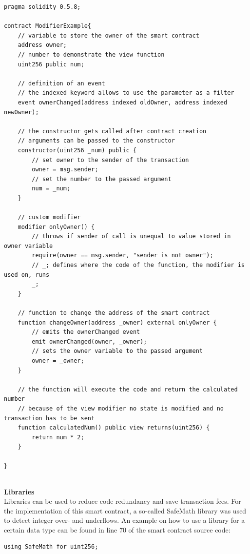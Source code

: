 \begin{lstlisting}[language=Solidity, caption={Basic structure of a smart contract}, label={lis:sc_basic_ref}]
pragma solidity 0.5.8;

contract ModifierExample{
    // variable to store the owner of the smart contract
    address owner;
    // number to demonstrate the view function
    uint256 public num;
    
    // definition of an event
    // the indexed keyword allows to use the parameter as a filter
    event ownerChanged(address indexed oldOwner, address indexed newOwner);
    
    // the constructor gets called after contract creation
    // arguments can be passed to the constructor
    constructor(uint256 _num) public {
        // set owner to the sender of the transaction
        owner = msg.sender;
        // set the number to the passed argument
        num = _num;
    }
    
    // custom modifier
    modifier onlyOwner() {
        // throws if sender of call is unequal to value stored in owner variable
        require(owner == msg.sender, "sender is not owner");
        // _; defines where the code of the function, the modifier is used on, runs
        _;
    }
    
    // function to change the address of the smart contract
    function changeOwner(address _owner) external onlyOwner {
        // emits the ownerChanged event
        emit ownerChanged(owner, _owner);
        // sets the owner variable to the passed argument
        owner = _owner;
    }
    
    // the function will execute the code and return the calculated number
    // because of the view modifier no state is modified and no transaction has to be sent
    function calculatedNum() public view returns(uint256) {
        return num * 2;
    }
    
}
\end{lstlisting}
\leavevmode
\\
\textbf{Libraries}\\
Libraries can be used to reduce code redundancy and save transaction fees. For the implementation of this smart contract, a so-called SafeMath library was used to detect integer over- and underflows.
An example on how to use a library for a certain data type can be found in line 70 of the smart contract source code:
\\
\begin{lstlisting}[language=Solidity, caption={Using the SafeMath library}, label={lis:safemath_use}, firstnumber=70]
using SafeMath for uint256;
\end{lstlisting}
